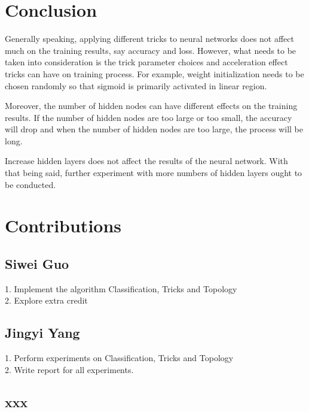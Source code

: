 \documentclass{article} %
\begin{document}

\section{Conclusion}
Generally speaking, applying different tricks to neural networks does not affect much on the training results, say accuracy and loss. However, what needs to be taken into consideration is the trick parameter choices and acceleration effect tricks can have on training process. For example, weight initialization needs to be chosen randomly so that sigmoid is primarily activated in linear region.   
 
Moreover, the number of hidden nodes can have different effects on the training results. If the number of hidden nodes are too large or too small, the accuracy will drop and when the number of hidden nodes are too large, the process will be long.
 
Increase hidden layers does not affect the results of the neural network. With that being said, further experiment with more numbers of hidden layers ought to be conducted. 


\section{Contributions}
\subsection{Siwei Guo}
1. Implement the algorithm Classification, Tricks and Topology\\
2. Explore extra credit

\subsection{Jingyi Yang}
1. Perform experiments on Classification, Tricks and Topology \\
2. Write report for all experiments.

\subsection{xxx}
\end{document}
